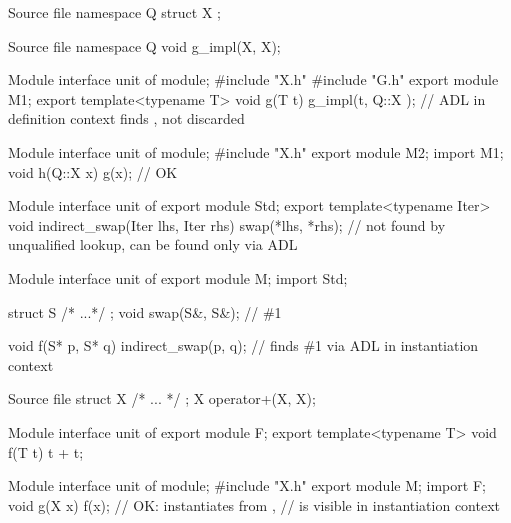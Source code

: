 \pnum
\begin{example}
\begin{codeblocktu}{Source file }
namespace Q {
  struct X { };
}
\end{codeblocktu}

\begin{codeblocktu}{Source file }
namespace Q {
  void g_impl(X, X);
}
\end{codeblocktu}

\begin{codeblocktu}{Module interface unit of }
module;
#include "X.h"
#include "G.h"
export module M1;
export template<typename T>
void g(T t) {
  g_impl(t, Q::X{ });   // ADL in definition context finds ,  not discarded
}
\end{codeblocktu}

\begin{codeblocktu}{Module interface unit of }
module;
#include "X.h"
export module M2;
import M1;
void h(Q::X x) {
   g(x);                // OK
}
\end{codeblocktu}
\end{example}

\pnum
\begin{example}
\begin{codeblocktu}{Module interface unit of }
export module Std;
export template<typename Iter>
void indirect_swap(Iter lhs, Iter rhs)
{
  swap(*lhs, *rhs);     //  not found by unqualified lookup, can be found only via ADL
}
\end{codeblocktu}

\begin{codeblocktu}{Module interface unit of }
export module M;
import Std;

struct S { /* ...*/ };
void swap(S&, S&);      // \#1

void f(S* p, S* q)
{
  indirect_swap(p, q);  // finds \#1 via ADL in instantiation context
}
\end{codeblocktu}
\end{example}

\pnum
\begin{example}
\begin{codeblocktu}{Source file }
struct X { /* ... */ };
X operator+(X, X);
\end{codeblocktu}

\begin{codeblocktu}{Module interface unit of }
export module F;
export template<typename T>
void f(T t) {
  t + t;
}
\end{codeblocktu}

\begin{codeblocktu}{Module interface unit of }
module;
#include "X.h"
export module M;
import F;
void g(X x) {
  f(x);             // OK: instantiates  from ,
                    //  is visible in instantiation context
}
\end{codeblocktu}
\end{example}


